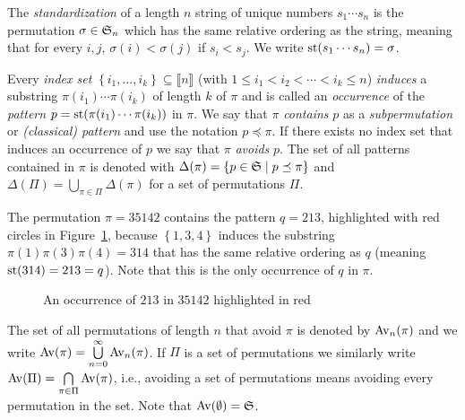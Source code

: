 \begin{definition}
  The \emph{standardization} of a length $n$ string of unique numbers $s_1 
  \cdots s_n$ is the permutation $\sigma \in \S_n$ which has the same relative 
  ordering as the string, meaning that for every $i, j$, $\sigma(i) < \sigma(j)$ 
  if $s_i < s_j$. We write $\st(s_1 \cdots s_n) = \sigma$.
\end{definition}

Every \emph{index set} $\left\{ i_1, \ldots, i_k \right\} \subseteq \llbracket n 
\rrbracket$ (with $1 \leq i_1 < i_2 < \cdots < i_k \leq n$) \emph{induces} a 
substring $\pi(i_1)\cdots\pi(i_k)$ of length $k$ of $\pi$ and is called an 
\emph{occurrence} of the \emph{pattern} $p = \st(\pi(i_1)\cdots\pi(i_k))$ in 
$\pi$. We say that $\pi$ \emph{contains} $p$ as a \emph{subpermutation} or 
\emph{(classical) pattern} and use the notation $p \preceq \pi$. If there exists 
no index set that induces an occurrence of $p$ we say that $\pi$ \emph{avoids} 
$p$. The set of all patterns contained in $\pi$ is denoted with $\Delta(\pi) = 
\left\{ p \in \S \mid p \preceq \pi \right\}$ and $\Delta(\Pi) = \bigcup_{\pi 
\in \Pi}{\Delta(\pi)}$ for a set of permutations $\Pi$.

\begin{example}
  The permutation $\pi = 35142$ contains the pattern $q = 213$, highlighted with 
  red circles in Figure~\ref{figure:q in pi}, because $\left\{ 1, 3, 4 \right\}$ 
  induces the substring $\pi(1)\pi(3)\pi(4)= 314$ that has the same relative 
  ordering as $q$ (meaning $\st(314) = 213 = q$). Note that this is the only 
  occurrence of $q$ in $\pi$. 
  \label{example:q in pi}

  \begin{figure}[htbp]
    \center
    \caption{An occurrence of $213$ in $35142$ highlighted in red}
    \label{figure:q in pi}
  \end{figure}
\end{example}

The set of all permutations of length $n$ that avoid $\pi$ is denoted by 
$\Avn{\pi}$ and we write $\Av{\pi} = \bigcup\limits_{n=0}^{\infty}\Avn{\pi}$. 
If $\Pi$ is a set of permutations we similarly write $\Av{\Pi} = 
\bigcap\limits_{\pi \in \Pi}\Av{\pi}$, i.e., avoiding a set of permutations 
means avoiding every permutation in the set. Note that $\Av{\emptyset} = \S$.

